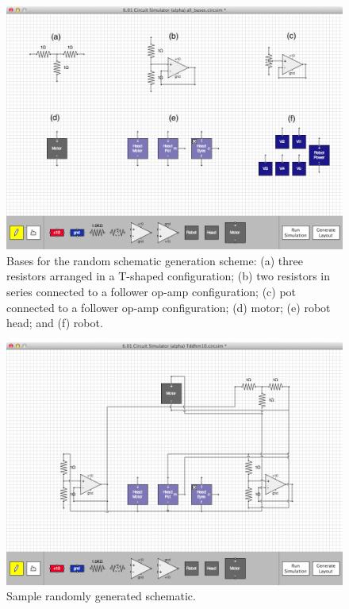 \begin{figure}
\begin{center}
\includegraphics[width=\textwidth]{Images/auto_generation_bases.png}
\caption[Random schematic generation bases]{Bases for the random schematic
generation scheme:
(a) three resistors arranged in a T-shaped configuration;
(b) two resistors in series connected to a follower op-amp configuration;
(c) pot connected to a follower op-amp configuration;
(d) motor;
(e) robot head; and
(f) robot.}
\label{fig:random_gen_bases}
\end{center}
\end{figure}

\begin{figure}
\begin{center}
\includegraphics[width=\textwidth]{Images/auto_generation_example.png}
\caption[Sample randomly generated schematic]{Sample randomly generated
schematic.}
\label{fig:example_random_schematic}
\end{center}
\end{figure}

